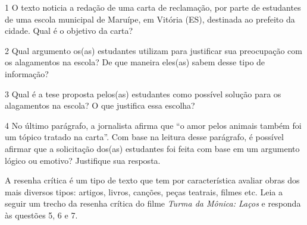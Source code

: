 \num{1} O texto noticia a redação de uma carta de reclamação, por parte
de estudantes de uma escola municipal de Maruípe, em Vitória (ES),
destinada ao prefeito da cidade. Qual é o objetivo da carta?


\num{2} Qual argumento os(as) estudantes utilizam para justificar sua
preocupação com os alagamentos na escola? De que maneira eles(as) sabem
desse tipo de informação?


\num{3} Qual é a tese proposta pelos(as) estudantes como possível
solução para os alagamentos na escola? O que justifica essa escolha?


\num{4} No último parágrafo, a jornalista afirma que ``o amor pelos
animais também foi um tópico tratado na carta''. Com base na leitura
desse parágrafo, é possível afirmar que a solicitação dos(as) estudantes
foi feita com base em um argumento lógico ou emotivo? Justifique sua
resposta.


A resenha crítica é um tipo de texto que tem por característica
avaliar obras dos mais diversos tipos: artigos, livros, canções, peças
teatrais, filmes etc. Leia a seguir um trecho da resenha crítica do
filme \emph{Turma da Mônica: Laços} e responda às questões 5, 6 e 7.
\enlargethispage{3\baselineskip}


